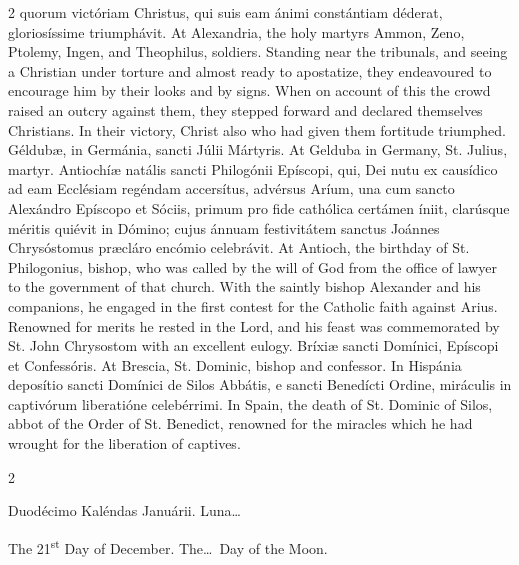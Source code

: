 \begin{paracol}{2}
  quorum victóriam Christus, qui suis eam ánimi constántiam déderat,
  gloriosíssime triumphávit.
\switchcolumn
{}
At Alexandria, the holy martyrs Ammon, Zeno, Ptolemy, Ingen, and Theophilus, 
 soldiers. Standing near the tribunals, and seeing a Christian under 
 torture and almost ready to apostatize, they endeavoured to encourage him by 
 their looks and by signs. When on account of this the crowd raised an 
 outcry against them, they stepped forward and declared themselves 
 Christians. In their victory, Christ also who had given them fortitude 
 triumphed.
\switchcolumn*
{}
Géldubæ, in 
 Germánia, sancti Júlii Mártyris.
\switchcolumn
{}
At Gelduba in Germany, St. Julius, martyr.
\switchcolumn*
{}
Antiochíæ natális sancti Philogónii Epíscopi, 
 qui, Dei nutu ex causídico ad eam Ecclésiam regéndam accersítus, advérsus 
 Aríum, una cum sancto Alexándro Epíscopo et Sóciis, primum pro fide 
 cathólica certámen íniit, clarúsque méritis quiévit in Dómino; cujus ánnuam 
 festivitátem sanctus Joánnes Chrysóstomus præcláro encómio celebrávit.
\switchcolumn
{}
At Antioch, the birthday of St. Philogonius, bishop, who was called by the 
 will of God from the office of lawyer to the government of that church. 
 With the saintly bishop Alexander and his companions, he engaged in the 
 first contest for the Catholic faith against Arius. Renowned for 
 merits he rested in the Lord, and his feast was commemorated by St. John 
 Chrysostom with an excellent eulogy.
\switchcolumn*
{}
Bríxiæ sancti Domínici, Epíscopi et Confessóris.
\switchcolumn
{}
At Brescia, St. Dominic, bishop and confessor.
\switchcolumn*
{}
In Hispánia deposítio sancti Domínici de Silos Abbátis, e sancti Benedícti 
 Ordine, miráculis in captivórum liberatióne celebérrimi.
\switchcolumn
{}
In 
 Spain, the death of St. Dominic of Silos, abbot of the Order of St. 
 Benedict, renowned for the miracles which he had wrought for the liberation 
 of captives.
\switchcolumn*
{}
\end{paracol}


\begin{paracol}{2}
\begin{center}{\color{gregoriocolor} Duodécimo Kaléndas Januárii. 
 Luna\dots\ }\end{center}
\switchcolumn
{}
\begin{center}{\color{gregoriocolor} The 
 21\textsuperscript{st} Day of 
 December. The\dots\ Day of the Moon.}\end{center}
\end{paracol}

